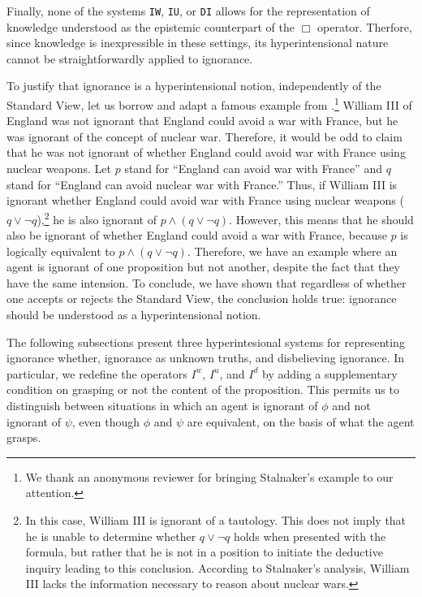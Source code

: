 \documentclass{article}
\begin{document}
Finally, none of the systems \texttt{IW}, \texttt{IU}, or \texttt{DI} allows for the representation of  knowledge understood as the epistemic counterpart of the $\Box$ operator. Therfore, since knowledge is inexpressible in these settings, its hyperintensional nature cannot be straightforwardly applied to ignorance. 

To justify that ignorance is a hyperintensional notion, independently of the Standard View, let us borrow and adapt a famous example from \citet[p. 88]{Stalnaker1984}.\footnote{We thank an anonymous reviewer for bringing Stalnaker's example to our attention.} William III of England was not ignorant that England could avoid a war with France, but he was ignorant of the concept of nuclear war. Therefore, it would be odd to claim that he was not ignorant of whether England could avoid war with France using nuclear weapons. Let $p$ stand for ``England can avoid war with France'' and $q$ stand for ``England can avoid nuclear war with France.''  Thus, if William III is ignorant whether England could avoid war with France using nuclear  weapons ($q \vee \neg q$),\footnote{In this case, William III is ignorant of a tautology. This does not imply that he is unable to determine whether $q \vee \neg q$ holds when presented with the formula, but rather that he is not in a position to initiate the deductive inquiry leading to this conclusion. According to Stalnaker's analysis, William III lacks the information necessary to reason about nuclear wars.} he is also ignorant of $p \wedge (q \vee \neg q)$. However, this means that he should also be ignorant of whether England could avoid a war with France, because $p$ is logically equivalent to $p \wedge (q \vee \neg q)$. Therefore, we have an example where an agent is ignorant of one proposition but not another, despite the fact that they have the same intension. To conclude, we have shown that regardless of whether one accepts or rejects the Standard View, the conclusion holds true: ignorance should be understood as a hyperintensional notion.



The following subsections present three hyperintesional systems for representing ignorance whether, ignorance as unknown truths, and disbelieving ignorance. In particular, we redefine the operators $I^{w}$, $I^{u}$, and $I^{d}$ by adding a supplementary condition on grasping or not the content of the proposition. This permits us to distinguish between situations in which an agent is ignorant of $\phi$ and not ignorant of $\psi$, even though $\phi$ and $\psi$ are equivalent, on the basis of what the agent grasps.
\end{document}
